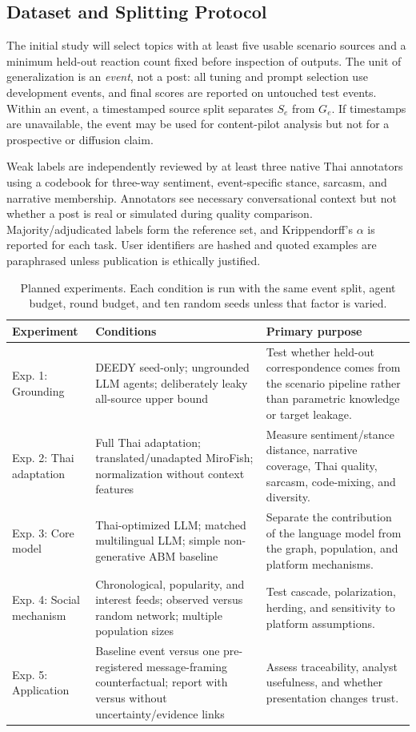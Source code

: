 \documentclass[conference]{IEEEtran}
\begin{document}
\subsection{Dataset and Splitting Protocol}

The initial study will select topics with at least five usable scenario sources
and a minimum held-out reaction count fixed before inspection of outputs. The
unit of generalization is an \emph{event}, not a post: all tuning and prompt
selection use development events, and final scores are reported on untouched
test events. Within an event, a timestamped source split separates $S_e$ from
$G_e$. If timestamps are unavailable, the event may be used for content-pilot
analysis but not for a prospective or diffusion claim.

Weak labels are independently reviewed by at least three native Thai
annotators using a codebook for three-way sentiment, event-specific stance,
sarcasm, and narrative membership. Annotators see necessary conversational
context but not whether a post is real or simulated during quality comparison.
Majority/adjudicated labels form the reference set, and Krippendorff's
$\alpha$ is reported for each task. User identifiers are hashed and quoted
examples are paraphrased unless publication is ethically justified.

\begin{table}[t]
\caption{Planned experiments. Each condition is run with the same event split,
agent budget, round budget, and ten random seeds unless that factor is varied.}
\label{tab:experiments}
\centering
\footnotesize
\begin{tabular}{@{}p{}p{}p{}@{}}
\toprule
Experiment & Conditions & Primary purpose \\
\midrule
Exp. 1: Grounding & DEEDY seed-only; ungrounded LLM agents; deliberately leaky
all-source upper bound & Test whether held-out correspondence comes from the
scenario pipeline rather than parametric knowledge or target leakage. \\
Exp. 2: Thai adaptation & Full Thai adaptation; translated/unadapted MiroFish;
normalization without context features & Measure sentiment/stance distance,
narrative coverage, Thai quality, sarcasm, code-mixing, and diversity. \\
Exp. 3: Core model & Thai-optimized LLM; matched multilingual LLM; simple
non-generative ABM baseline & Separate the contribution of the language model
from the graph, population, and platform mechanisms. \\
Exp. 4: Social mechanism & Chronological, popularity, and interest feeds;
observed versus random network; multiple population sizes & Test cascade,
polarization, herding, and sensitivity to platform assumptions. \\
Exp. 5: Application & Baseline event versus one pre-registered message-framing
counterfactual; report with versus without uncertainty/evidence links & Assess
traceability, analyst usefulness, and whether presentation changes trust. \\
\bottomrule
\end{tabular}
\end{table}
\end{document}
